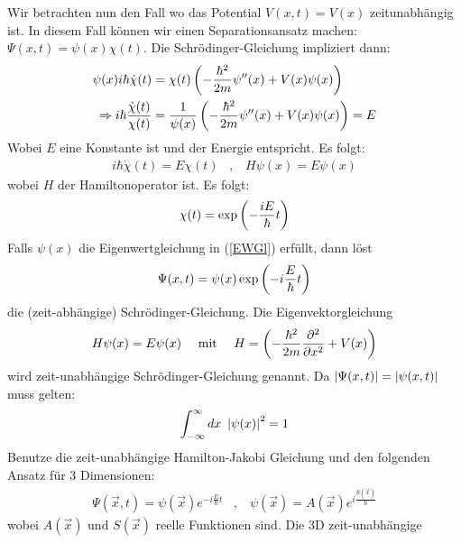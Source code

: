 Wir betrachten nun den Fall wo das Potential $V(x,t) = V(x)$ zeitunabhängig ist.
In diesem Fall können wir einen Separationsansatz machen: $\Psi(x,t) = \psi(x) \chi(t)$.
Die Schrödinger-Gleichung impliziert dann:
\begin{align*}
    \psi(x) i \hbar \dot{\chi}(t) &=
    \chi(t) \left( -\frac{\hbar^2}{2 m} \psi''(x) + V(x) \psi(x) \right)
    \\
    \Rightarrow
    i \hbar \frac{\dot{\chi}(t)}{\chi(t)} &= \frac{1}{\psi(x)}
    \left( -\frac{\hbar^2}{2m} \psi''(x) + V(x) \psi(x) \right) = E
\end{align*}
Wobei $E$ eine Konstante ist und der Energie entspricht. Es folgt:
\begin{align}\label{EWGl}
    i \hbar \dot{\chi}(t) = E \chi(t)
    \hspace{10pt} , \hspace{10pt}
    H \psi(x) = E \psi(x) 
\end{align}
wobei $H$ der Hamiltonoperator ist. Es folgt:
\begin{align*}
    \chi(t) = \exp \left( - \frac{i E}{\hbar} t \right)
\end{align*}
Falls $\psi(x)$ die Eigenwertgleichung in (\ref{EWGl}) erfüllt, dann löst
\begin{align*}
    \Psi(x,t) = \psi(x) \exp \left( - i \frac{E}{\hbar} t \right)
\end{align*}
die (zeit-abhängige) Schrödinger-Gleichung. Die Eigenvektorgleichung
\begin{align*}
    H \psi(x) = E \psi(x)
    \hspace{10pt} \text{ mit } \hspace{10pt}
    H = \left( - \frac{\hbar^2}{2m} \frac{\partial^2}{\partial x^2} + V(x) \right)
\end{align*}
wird zeit-unabhängige Schrödinger-Gleichung genannt. Da $\left\vert \Psi(x,t) \right\vert =
\left\vert \psi(x,t) \right\vert$ muss gelten:
\begin{align*}
    \int_{-\infty}^\infty dx \ \left\vert \psi(x) \right\vert^2 = 1
\end{align*}
Benutze die zeit-unabhängige Hamilton-Jakobi Gleichung und den folgenden
Ansatz für 3 Dimensionen:
\begin{align*}
    \Psi(\vec{x},t) = \psi(\vec{x}) e^{- i \frac{E}{\hbar} t}
    \hspace{10pt} , \hspace{10pt}
    \psi(\vec{x}) = A(\vec{x}) e^{i \frac{S(\vec{x})}{\hbar}}
\end{align*}
wobei $A(\vec{x})$ und $S(\vec{x})$ reelle Funktionen sind. Die 3D zeit-unabhängige
